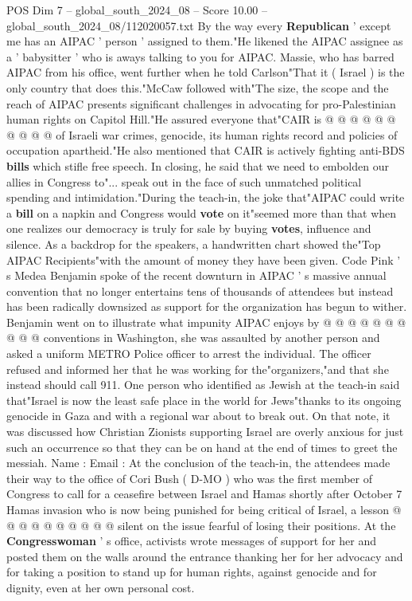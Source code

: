 \begin{textsample}{POS Dim 7 – global\_south\_2024\_08 – Score 10.00 – global\_south\_2024\_08/112020057.txt}
By the way every \textbf{Republican} ' except me has an AIPAC ' person ' assigned to them."He likened the AIPAC assignee as a ' babysitter ' who is aways talking to you for AIPAC.
Massie, who has barred AIPAC from his office, went further when he told Carlson"That it ( Israel ) is the only country that does this."McCaw followed with"The size, the scope and the reach of AIPAC presents significant challenges in advocating for pro-Palestinian human rights on Capitol Hill."He assured everyone that"CAIR is @ @ @ @ @ @ @ @ @ @ of Israeli war crimes, genocide, its human rights record and policies of occupation apartheid."He also mentioned that CAIR is actively fighting anti-BDS \textbf{bills} which stifle free speech.
In closing, he said that we need to embolden our allies in Congress to"... speak out in the face of such unmatched political spending and intimidation."During the teach-in, the joke that"AIPAC could write a \textbf{bill} on a napkin and Congress would \textbf{vote} on it"seemed more than that when one realizes our democracy is truly for sale by buying \textbf{votes}, influence and silence.
As a backdrop for the speakers, a handwritten chart showed the"Top AIPAC Recipients"with the amount of money they have been given.
Code Pink ' s Medea Benjamin spoke of the recent downturn in AIPAC ' s massive annual convention that no longer entertains tens of thousands of attendees but instead has been radically downsized as support for the organization has begun to wither.
Benjamin went on to illustrate what impunity AIPAC enjoys by @ @ @ @ @ @ @ @ @ @ conventions in Washington, she was assaulted by another person and asked a uniform METRO Police officer to arrest the individual.
The officer refused and informed her that he was working for the"organizers,"and that she instead should call 911.
One person who identified as Jewish at the teach-in said that"Israel is now the least safe place in the world for Jews"thanks to its ongoing genocide in Gaza and with a regional war about to break out.
On that note, it was discussed how Christian Zionists supporting Israel are overly anxious for just such an occurrence so that they can be on hand at the end of times to greet the messiah.
Name : Email : At the conclusion of the teach-in, the attendees made their way to the office of Cori Bush ( D-MO ) who was the first member of Congress to call for a ceasefire between Israel and Hamas shortly after October 7 Hamas invasion who is now being punished for being critical of Israel, a lesson @ @ @ @ @ @ @ @ @ @ silent on the issue fearful of losing their positions.
At the \textbf{Congresswoman} ' s office, activists wrote messages of support for her and posted them on the walls around the entrance thanking her for her advocacy and for taking a position to stand up for human rights, against genocide and for dignity, even at her own personal cost.

\end{textsample}
